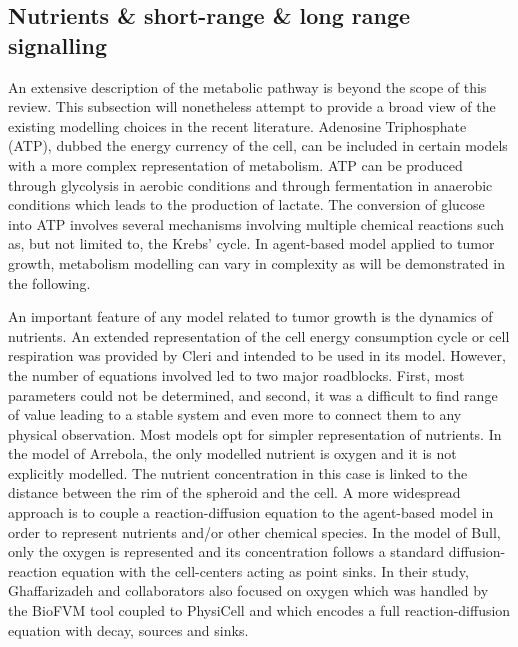 \documentclass[11pt,a4paper]{article}
\begin{document}
\subsection{Nutrients \& short-range \& long range signalling}
An extensive description of the metabolic pathway is beyond the scope of this review. This subsection will nonetheless attempt to provide a broad view of the existing modelling choices in the recent literature. Adenosine Triphosphate (ATP), dubbed the energy currency of the cell, can  be included in certain models with a more complex representation of metabolism.  ATP can be produced through glycolysis in aerobic conditions and through fermentation in anaerobic conditions which leads to the production of lactate. The conversion of glucose into ATP involves several mechanisms involving multiple chemical reactions such as, but not limited to, the Krebs' cycle. In agent-based model applied to tumor growth, metabolism modelling can vary in complexity as will be demonstrated in the following.  

An important feature of any model related to tumor growth is the dynamics of nutrients. An extended representation of the cell energy consumption cycle or cell respiration was provided by Cleri and intended to be used in its model. However, the number of equations involved led to two major roadblocks. First, most parameters could not be determined, and second, it was a difficult to find range of value leading to a stable system and even more to connect them to any physical observation.\cite{Cleri2019} Most models opt for simpler representation of nutrients.  In the model of Arrebola, the only modelled nutrient is oxygen and it is not explicitly modelled.\cite{Arrebola2020} The nutrient concentration in this case is linked to the distance between the rim of the spheroid and the cell. A more widespread approach is to couple a reaction-diffusion equation to the agent-based model in order to represent nutrients and/or other chemical species. In the model of Bull, only the oxygen is represented and its concentration follows a standard diffusion-reaction equation with the cell-centers acting as point sinks.\cite{Bull2020} In their study, Ghaffarizadeh and collaborators also focused on oxygen which was handled by the BioFVM tool coupled to PhysiCell and which encodes a full reaction-diffusion equation with decay, sources and sinks.\cite{Ghaffarizadeh2017}
\end{document}
